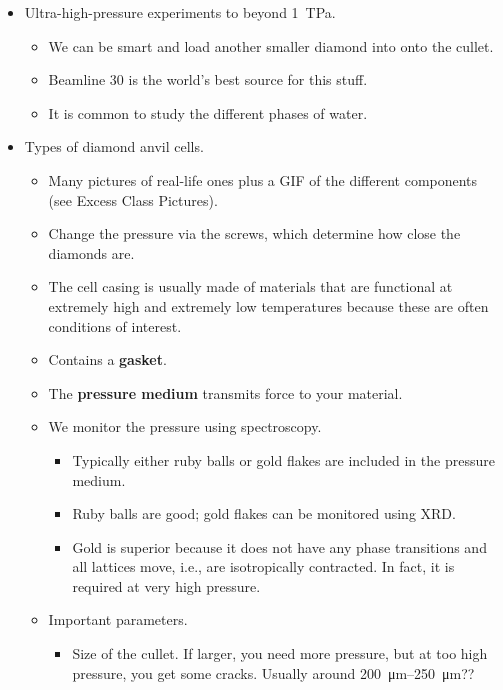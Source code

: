 \documentclass[../notes.tex]{subfiles}
\begin{document}
\begin{itemize}
    \begin{itemize}
        \item \SIrange{2}{500}{\micro\meter} in size, depending on the type of DAC.
    \end{itemize}
    \item Ultra-high-pressure experiments to beyond \SI{1}{\tera\pascal}.
    \begin{itemize}
        \item We can be smart and load another smaller diamond into onto the cullet.
        \item Beamline 30 is the world's best source for this stuff.
        \item It is common to study the different phases of water.
    \end{itemize}
    \item Types of diamond anvil cells.
    \begin{itemize}
        \item Many pictures of real-life ones plus a GIF of the different components (see Excess Class Pictures).
        \item Change the pressure via the screws, which determine how close the diamonds are.
        \item The cell casing is usually made of materials that are functional at extremely high and extremely low temperatures because these are often conditions of interest.
        \item Contains a \textbf{gasket}.
        \item The \textbf{pressure medium} transmits force to your material.
        \item We monitor the pressure using spectroscopy.
        \begin{itemize}
            \item Typically either ruby balls or gold flakes are included in the pressure medium.
            \item Ruby balls are good; gold flakes can be monitored using XRD.
            \item Gold is superior because it does not have any phase transitions and all lattices move, i.e., are isotropically contracted. In fact, it is required at very high pressure.
        \end{itemize}
        \item Important parameters.
        \begin{itemize}
            \item Size of the cullet. If larger, you need more pressure, but at too high pressure, you get some cracks. Usually around \SIrange{200}{250}{\micro\meter}??

\end{itemize}
\end{itemize}
\end{itemize}
\end{document}
